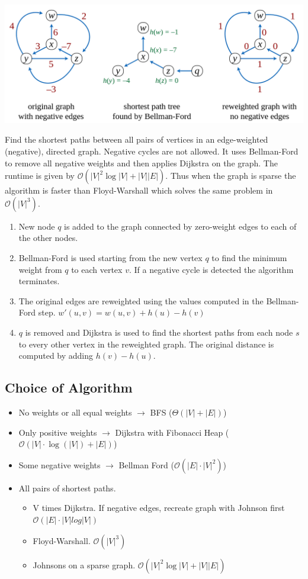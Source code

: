 \documentclass[9pt,landscape,a4paper, table]{extarticle}
\begin{document}
\begin{multicols*}{3}
\begin{center}
    \includegraphics[width=0.7\linewidth]{img/johnson.png}
\end{center}
\vspace{-0.2cm}

Find the shortest paths between all pairs of vertices in an edge-weighted (negative), directed graph. Negative cycles are not allowed. It uses Bellman-Ford to remove all negative weights and then applies Dijkstra on the graph. The runtime is given by $\mathcal{O}(|V|^{2}\log |V|+|V||E|)$. Thus when the graph is sparse the algorithm is faster than Floyd-Warshall which solves the same problem in $\mathcal{O}(|V|
^3)$. 

\begin{enumerate}
    \item New node $q$ is added to the graph connected by zero-weight edges to each of the other nodes. 
    \item Bellman-Ford is used starting from the new vertex $q$ to find the minimum weight from $q$ to each vertex $v$. If a negative cycle is detected the algorithm terminates. 
    \item The original edges are reweighted using the values computed in the Bellman-Ford step. $w'(u,v) = w(u,v) + h(u) - h(v)$
    \item $q$ is removed and Dijkstra is used to find the shortest paths from each node $s$ to every other vertex in the reweighted graph. The original distance is computed by adding $h(v)- h(u)$.
\end{enumerate}

\subsection{Choice of Algorithm}
\begin{itemize}
	\item No weights or all equal weights $\rightarrow$ BFS ($\Theta(|V|+|E|)$)
	\item Only positive weights $\rightarrow$ Dijkstra with Fibonacci Heap ($\mathcal{O}(|V|\cdot \log(|V|) + |E|)$)
	\item Some negative weights $\rightarrow$ Bellman Ford ($\mathcal{O}(|E|\cdot|V|^2)$)
	\item All pairs of shortest paths.
	\begin{itemize}
	    \item V times Dijkstra. If negative edges, recreate graph with Johnson first $\mathcal{O}(|E| \cdot |V|  log |V| )$
	    \item Floyd-Warshall. $\mathcal{O}( |V|^3 )$
	    \item Johnsons on a sparse graph. $\mathcal{O}(|V|^{2}\log |V|+|V||E|)$
	\end{itemize} 
	

\end{itemize}
\end{multicols*}
\end{document}
